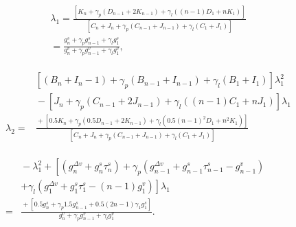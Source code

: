 \documentclass[journal]{IEEEtran}
\begin{document}
\begin{equation}
\begin{gathered}
\lambda_{1}=\frac{\left[K_{n}+\gamma_{p}\left(D_{n\!-\!1}+2 K_{n\!-\!1}\right)+\gamma_{l}\left((n\!-\!1) D_{1}+n K_{1}\right)\right]}{\left[C_{n}+J_{n}+\gamma_{p}\left(C_{n\!-\!1}+J_{n\!-\!1}\right)+\gamma_{l}\left(C_{1}+J_{1}\right)\right]} \\
=\frac{g_{n}^{s}+\gamma_{p} g_{n\!-\!1}^{s}+\gamma_{l} g_{1}^{s}}{g_{n}^{v}+\gamma_{p} g_{n\!-\!1}^{v}+\gamma_{l} g_{1}^{v}},
\end{gathered}
\label{Eq17}
\end{equation}

\begin{equation}
\begin{gathered}
\begin{aligned}
&{\left[\left(B_{n}\!+\!I_{n}\!-\!1\right)\!+\!\gamma_{p}\left(B_{n\!-\!1}\!+\!I_{n\!-\!1}\right)\!+\!\gamma_{l}\left(B_{1}\!+\!I_{1}\right)\right] \lambda_{1}^{2}} \\
&\!-\!\left[J_{n}\!+\!\gamma_{p}\left(C_{n\!-\!1}\!+\!2 J_{n\!-\!1}\right)\!+\!\gamma_{l}\left((n\!-\!1) C_{1}\!+\!n J_{1}\right)\right] \lambda_{1} \\
\lambda_{2}=&\frac{\!+\!\left[0.5 K_{n}\!+\!\gamma_{p}\left(0.5 D_{n\!-\!1}\!+\!2 K_{n\!-\!1}\right)\!+\!\gamma_{l}\left(0.5(n\!-\!1)^{2} D_{1}\!+\!n^{2} K_{1}\right)\right]}{\left[C_{n}\!+\!J_{n}\!+\!\gamma_{p}\left(C_{n\!-\!1}\!+\!J_{n\!-\!1}\right)\!+\!\gamma_{l}\left(C_{1}\!+\!J_{1}\right)\right]} \\
\\
\end{aligned}
\\
\begin{aligned}
&\!-\!\lambda_{1}^{2}\!+\!\left[\left(g_{n}^{\Delta v}\!+\!g_{n}^{s} \tau_{n}^{s}\right)\!+\!\gamma_{p}\left(g_{n\!-\!1}^{\Delta v}\!+\!g_{n\!-\!1}^{s} \tau_{n\!-\!1}^{s}\!-\!g_{n\!-\!1}^{v}\right)\right. \\
&\left.+\gamma_{l}\left(g_{1}^{\Delta v}\!+\!g_{1}^{s} \tau_{1}^{s}\!-\!(n\!-\!1) g_{1}^{v}\right)\right] \lambda_{1} \\
= &\frac{\!+\!\left[0.5 g_{n}^{s}\!+\!\gamma_{p} 1.5 g_{n\!-\!1}^{s}\!+\!0.5(2 n\!-\!1) \gamma_{1} g_{1}^{s}\right]}{g_{n}^{v}\!+\!\gamma_{p} g_{n\!-\!1}^{v}\!+\!\gamma_{l} g_{1}^{v}}.
\end{aligned}
\end{gathered}
\label{Eq18}
\end{equation}
\end{document}
